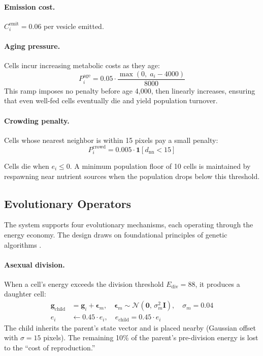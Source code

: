 \documentclass[10pt,twocolumn]{article}
\begin{document}
\paragraph{Emission cost.}
$C_i^{\text{emit}} = 0.06$ per vesicle emitted.

\paragraph{Aging pressure.}
Cells incur increasing metabolic costs as they age:
\begin{equation}
  P_i^{\text{age}} = 0.05 \cdot \frac{\max(0,\; a_i - 4000)}{8000}
  \label{eq:aging}
\end{equation}
This ramp imposes no penalty before age 4{,}000, then linearly increases, ensuring that even well-fed cells eventually die and yield population turnover.

\paragraph{Crowding penalty.}
Cells whose nearest neighbor is within 15 pixels pay a small penalty:
\begin{equation}
  P_i^{\text{crowd}} = 0.005 \cdot \mathbf{1}[d_{\text{nn}} < 15]
  \label{eq:crowding}
\end{equation}

Cells die when $e_i \leq 0$. A minimum population floor of 10 cells is maintained by respawning near nutrient sources when the population drops below this threshold.


\subsection{Evolutionary Operators}
\label{sec:evolution}

The system supports four evolutionary mechanisms, each operating through the energy economy.
The design draws on foundational principles of genetic algorithms \cite{holland1992adaptation,goldberg1989genetic}.

\paragraph{Asexual division.}
When a cell's energy exceeds the division threshold $E_{\text{div}} = 88$, it produces a daughter cell:
\begin{align}
  \mathbf{g}_{\text{child}} &= \mathbf{g}_i + \bm{\epsilon}_m, \quad \bm{\epsilon}_m \sim \mathcal{N}(\mathbf{0},\, \sigma_m^2 \mathbf{I}), \quad \sigma_m = 0.04 \label{eq:asexual_genome} \\
  e_i &\leftarrow 0.45 \cdot e_i, \quad e_{\text{child}} = 0.45 \cdot e_i \label{eq:asexual_energy}
\end{align}
The child inherits the parent's state vector and is placed nearby (Gaussian offset with $\sigma = 15$ pixels). The remaining 10\% of the parent's pre-division energy is lost to the ``cost of reproduction.''
\end{document}
